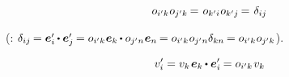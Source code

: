 

\vspace{-0.64em}\begin{equation}\label{orthogonalityofcosinematricies}
o_{i'k} \hspace{.1ex} o_{j'k} \hspace{-0.16ex} = \hspace{0.2ex} o_{k'i} \hspace{.1ex} o_{k'j} \hspace{-0.16ex} = \hspace{0.2ex} \delta_{ij}
\end{equation}

\vspace{-0.2em} \noindent (: $\delta_{ij} \hspace{-0.16ex} = \bm{e}'_i \hspace{-0.12ex} \dotp \bm{e}'_j \hspace{-0.16ex} = \cosinematrix{i'k} \hspace{.1ex} \bm{e}_k \hspace{-0.12ex} \dotp \cosinematrix{j'n} \hspace{.1ex} \bm{e}_n \hspace{-0.16ex} = \cosinematrix{i'k} \hspace{.1ex} \cosinematrix{j'n} \delta_{kn} \hspace{-0.16ex} = \cosinematrix{i'k} \hspace{.1ex} \cosinematrix{j'k} \hspace{0.1ex}$).



\nopagebreak\vspace{-0.25em}\begin{equation}\label{orthotransform:1}
v'_i = v_k \hspace{.2ex} \bm{e}_k \hspace{-0.12ex}\dotp \bm{e}'_i \hspace{-0.12ex} = \cosinematrix{i'k} \hspace{.2ex} v_k
\end{equation}

